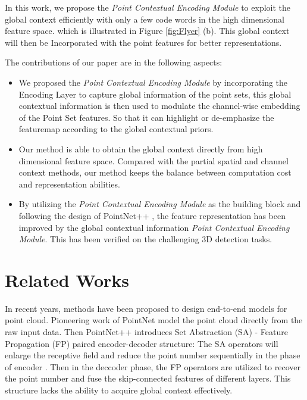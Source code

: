 \documentclass[runningheads]{llncs}
\begin{document}
In this work, we  propose the \emph{Point Contextual Encoding Module} to exploit the global context efficiently  with only a few code words in the high dimensional feature space. which is illustrated in Figure \ref{fig:Flyer} (b). This global context will then be Incorporated with the point features for better representations.%
 

 
The contributions of our paper are in the following aspects:
\begin{itemize}
    \item %
    We proposed the \emph{Point Contextual Encoding Module} by incorporating the Encoding Layer to capture global information of the point sets, %
    this global contextual information is then used to modulate the channel-wise embedding of the Point Set features. So that it can highlight or de-emphasize the featuremap  according to the global contextual priors.
    
    \item
    Our method is able to obtain the global context directly from high dimensional feature space. Compared with the partial spatial and channel context methods, our method keeps the balance between computation cost and representation abilities.
    
    \item  By utilizing the  \emph{Point Contextual Encoding Module}  as the building block and following the design of PointNet++ , the feature representation has been improved by the global contextual information  \emph{Point Contextual Encoding Module}. This has been verified on the challenging 3D detection tasks.
 
    
\end{itemize}

\section{Related Works}
\label{related_works}


In recent years,  methods \cite{pointcnn,sawnet,ASIS,kpconv,shape_matching,shapecontextnet} have been proposed to design end-to-end models for point cloud. Pioneering work of PointNet \cite{pointnet}  model the point cloud directly from the raw input data. Then PointNet++ \cite{pointnet++}  introduces  Set Abstraction (SA) - Feature Propagation (FP) paired encoder-decoder  structure: The SA operators  will enlarge the receptive field and reduce the point number sequentially in the phase of encoder . Then in the deccoder phase, the FP operators are utilized to recover the point number and fuse the skip-connected features of different layers. This structure lacks the ability to acquire global context effectively.
\end{document}
